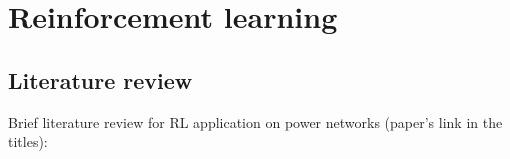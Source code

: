 

\section{Reinforcement learning}
\label{sec:rl}
\subsection{Literature review}
Brief literature review for RL application on power networks (paper's link in the titles): \\

